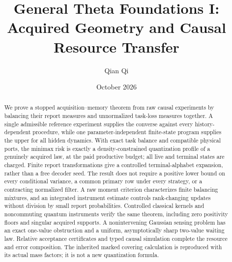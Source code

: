 \documentclass[11pt,reqno]{amsart}
\title[Acquired geometry and causal resource transfer]{General Theta Foundations I:\\Acquired Geometry and Causal Resource Transfer}
\author{Qian Qi}\date{October 2026}
\numberwithin{equation}{section}
\theoremstyle{definition}
\theoremstyle{remark}
\begin{document}
\begin{abstract}
We prove a stopped acquisition--memory theorem from raw causal experiments by balancing their report measures and unnormalized task-loss measures together. A single admissible reference experiment supplies the converse against every history-dependent procedure, while one parameter-independent finite-state program supplies the upper for all hidden dynamics. With exact task balance and compatible physical ports, the minimax risk is exactly a density-constrained quantization profile of a genuinely acquired law, at the paid productive budget; all live and terminal states are charged. Finite report transformations give a controlled terminal-alphabet expansion, rather than a free decoder seed. The result does not require a positive lower bound on every conditional variance, a common primary row under every strategy, or a contracting normalized filter. A raw moment criterion characterizes finite balancing mixtures, and an integrated instrument estimate controls rank-changing updates without division by small report probabilities. Controlled classical kernels and noncommuting quantum instruments verify the same theorem, including zero positivity floors and singular acquired supports. A nonintervening Gaussian sensing problem has an exact one-value obstruction and a uniform, asymptotically sharp two-value waiting law. Relative acceptance certificates and typed causal simulation complete the resource and error composition. The inherited marked covering calculation is reproduced with its actual mass factors; it is not a new quantization formula.
\end{abstract}
\maketitle










\appendix



\end{document}
